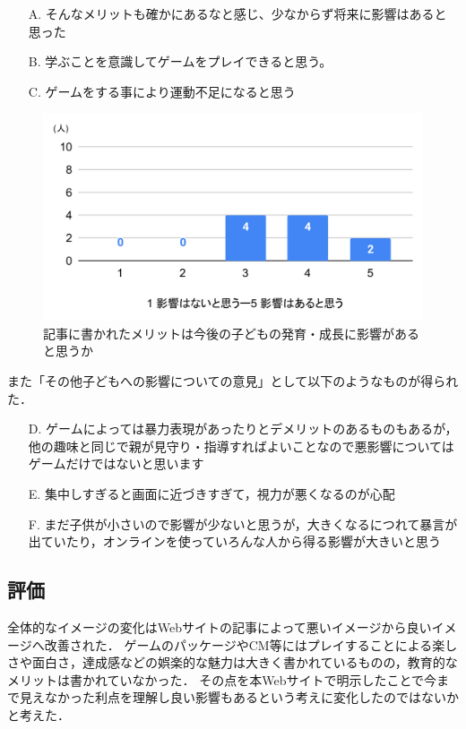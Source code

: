 \documentclass[12pt,a4j,titlepage]{ltjsarticle}
\begin{document}
\begin{itemize}
    \item[A.]  そんなメリットも確かにあるなと感じ、少なからず将来に影響はあると思った\\
    \item[B.]  学ぶことを意識してゲームをプレイできると思う。 \\
    \item[C.]  ゲームをする事により運動不足になると思う \\
\end{itemize}

\begin{figure}[H]
 \begin{center}
  \includegraphics[keepaspectratio, scale=0.6]{PDF/記事影響.pdf}
 \end{center}
 \caption{記事に書かれたメリットは今後の子どもの発育・成長に影響があると思うか}
 \label{fig:記事影響}
\end{figure}

また「その他子どもへの影響についての意見」として以下のようなものが得られた．

\begin{itemize}
    \item[D.] ゲームによっては暴力表現があったりとデメリットのあるものもあるが，他の趣味と同じで親が見守り・指導すればよいことなので悪影響についてはゲームだけではないと思います
    \item[E.] 集中しすぎると画面に近づきすぎて，視力が悪くなるのが心配
    \item[F.] まだ子供が小さいので影響が少ないと思うが，大きくなるにつれて暴言が出ていたり，オンラインを使っていろんな人から得る影響が大きいと思う
\end{itemize}

\subsection{評価}
全体的なイメージの変化はWebサイトの記事によって悪いイメージから良いイメージへ改善された．
ゲームのパッケージやCM等にはプレイすることによる楽しさや面白さ，達成感などの娯楽的な魅力は大きく書かれているものの，教育的なメリットは書かれていなかった．
その点を本Webサイトで明示したことで今まで見えなかった利点を理解し良い影響もあるという考えに変化したのではないかと考えた．
\end{document}
